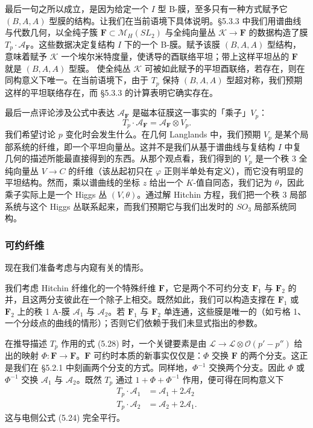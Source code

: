 最后一句之所以成立，是因为给定一个 $I$ 型 B-膜，至多只有一种方式赋予它 $(B,A,A)$ 型膜的结构。让我们在当前语境下具体说明。§5.3.3 中我们用谱曲线与代数几何，以全纯子簇 $\boldsymbol{F}\subset\mathcal{M}_H(SL_2)$ 与全纯向量丛 $\mathcal{K}\to\boldsymbol{F}$ 的数据构造了膜 $T_p\cdot\mathcal{A}_{\boldsymbol{F}}$。这些数据决定复结构 $I$ 下的一个 B-膜。赋予该膜 $(B,A,A)$ 型结构，意味着赋予 $\mathcal{K}$ 一个埃尔米特度量，使诱导的酉联络平坦；带上这样平坦丛的 $\boldsymbol{F}$ 就是 $(B,A,A)$ 型膜。
使全纯丛 $\mathcal{K}$ 可被如此赋予的平坦酉联络，若存在，则在同构意义下唯一。在当前语境下，由于 $T_p$ 保持 $(B,A,A)$ 型超对称，我们预期这样的平坦联络存在，而 §5.3.3 的计算表明它确实存在。

最后一点评论涉及公式中表达 $\mathcal{A}_{\boldsymbol{F}}$ 是磁本征膜这一事实的「乘子」$V_p$：
\begin{equation}\tag{5.29}
T_p\cdot\mathcal{A}_{\boldsymbol{F}}=\mathcal{A}_{\boldsymbol{F}}\otimes V_p.
\end{equation}
我们希望讨论 $p$ 变化时会发生什么。在几何 Langlands 中，我们预期 $V_p$ 是某个局部系统的纤维，即一个平坦向量丛。这并不是我们从基于谱曲线与复结构 $I$ 中复几何的描述所能最直接得到的东西。从那个观点看，我们得到的 $V_p$ 是一个秩 3 全纯向量丛 $V\to C$ 的纤维（该丛起初只在 $\varphi$ 正则半单处有定义），而它没有明显的平坦结构。然而，乘以谱曲线的坐标 $z$ 给出一个 $K$-值自同态，我们记为 $\theta$，因此乘子实际上是一个 Higgs 丛 $(V,\theta)$。通过解 Hitchin 方程，我们把一个秩 3 局部系统与这个 Higgs 丛联系起来，而我们预期它与我们出发时的 $SO_3$ 局部系统同构。

\subsubsection{可约纤维}

现在我们准备考虑与内窥有关的情形。

我们考虑 Hitchin 纤维化的一个特殊纤维 $\boldsymbol{F}$，它是两个不可约分支 $\boldsymbol{F}_1$ 与 $\boldsymbol{F}_2$ 的并，且这两分支彼此在一个除子上相交。既然如此，我们可以构造支撑在 $\boldsymbol{F}_1$ 或 $\boldsymbol{F}_2$ 上的秩 1 A-膜 $\mathcal{A}_1$ 与 $\mathcal{A}_2$。若 $\boldsymbol{F}_1$ 与 $\boldsymbol{F}_2$ 单连通，这些膜是唯一的（如亏格 1、一个分歧点的曲线的情形）；否则它们依赖于我们未显式指出的参数。

在推导描述 $T_p$ 作用的式 (5.28) 时，一个关键要素是由 $\mathcal{L}\to\mathcal{L}\otimes\mathcal{O}(p'-p'')$ 给出的映射 $\Phi:\boldsymbol{F}\to\boldsymbol{F}$。$\boldsymbol{F}$ 可约时本质的新事实仅仅是：$\Phi$ 交换 $\boldsymbol{F}$ 的两个分支。这正是我们在 §5.2.1 中刻画两个分支的方式。同样地，$\Phi^{-1}$ 交换两个分支。因此 $\Phi$ 或 $\Phi^{-1}$ 交换 $\mathcal{A}_1$ 与 $\mathcal{A}_2$。既然 $T_p$ 通过 $1+\Phi+\Phi^{-1}$ 作用，便可得在同构意义下
\begin{equation}\tag{5.30}
\begin{aligned}
T_p\cdot\mathcal{A}_1 &= \mathcal{A}_1+2\mathcal{A}_2\\
T_p\cdot\mathcal{A}_2 &= \mathcal{A}_2+2\mathcal{A}_1.
\end{aligned}
\end{equation}
这与电侧公式 (5.24) 完全平行。

